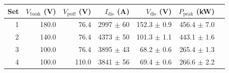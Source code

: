 \begin{tabular}{rrrrrrr}
\hline
Set & $V_\mathrm{bank}$ (V) & $V_\mathrm{puff}$ (V) & $I_\mathrm{dis}$ (A) & $V_\mathrm{dis}$ (V) & $P_\mathrm{peak}$ (kW) \\
\hline
1 & 180.0 & 76.4 & 2997 $\pm$ 60 & 152.3 $\pm$ 0.9 & 456.4 $\pm$ 7.0 \\
2 & 140.0 & 76.4 & 4373 $\pm$ 50 & 101.3 $\pm$ 1.1 & 443.1 $\pm$ 1.6 \\
3 & 100.0 & 76.4 & 3895 $\pm$ 43 & 68.2 $\pm$ 0.6 & 265.4 $\pm$ 1.3 \\
4 & 100.0 & 110.0 & 3841 $\pm$ 56 & 69.4 $\pm$ 0.6 & 266.6 $\pm$ 2.2 \\
\hline
\end{tabular}
